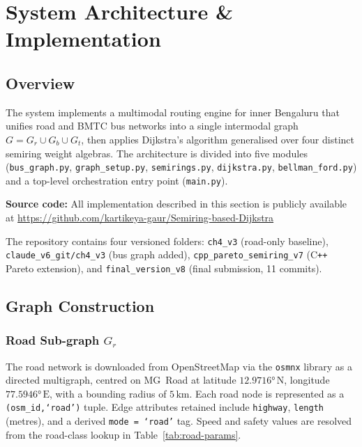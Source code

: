 \documentclass[12pt,a4paper]{article}
\begin{document}
\section{System Architecture \& Implementation}
\label{sec:architecture}

\subsection{Overview}

The system implements a multimodal routing engine for inner Bengaluru
that unifies road and BMTC bus networks into a single intermodal graph
$G = G_r \cup G_b \cup G_t$, then applies Dijkstra's algorithm
generalised over four distinct semiring weight algebras.
The architecture is divided into five modules
(\texttt{bus\_graph.py}, \texttt{graph\_setup.py},
\texttt{semirings.py}, \texttt{dijkstra.py},
\texttt{bellman\_ford.py}) and a top-level orchestration entry point
(\texttt{main.py}).

\begin{mdframed}[linewidth=1pt, linecolor=black, backgroundcolor=gray!8,
                 innertopmargin=8pt, innerbottommargin=8pt]
  \footnotesize\sloppy
  \textbf{Source code:}\quad
  All implementation described in this section is publicly available at
  \url{https://github.com/kartikeya-gaur/Semiring-based-Dijkstra}

  \smallskip
  The repository contains four versioned folders:
  \texttt{ch4\_v3} (road-only baseline),
  \texttt{claude\_v6\_git/ch4\_v3} (bus graph added),
  \texttt{cpp\_pareto\_semiring\_v7} (C\texttt{++} Pareto extension), and
  \texttt{final\_version\_v8} (final submission, 11 commits).
\end{mdframed}
\vspace{0.8em}

\subsection{Graph Construction}

\subsubsection{Road Sub-graph $G_r$}

The road network is downloaded from OpenStreetMap via the
\texttt{osmnx} library as a directed multigraph, centred on MG~Road
at latitude $12.9716°\,\mathrm{N}$, longitude
$77.5946°\,\mathrm{E}$, with a bounding radius of $5\,\mathrm{km}$.
Each road node is represented as a \texttt{(osm\_id,\;`road')} tuple.
Edge attributes retained include \texttt{highway}, \texttt{length} (metres),
and a derived \texttt{mode = `road'} tag.
Speed and safety values are resolved from the road-class lookup in
Table~\ref{tab:road-params}.
\end{document}
